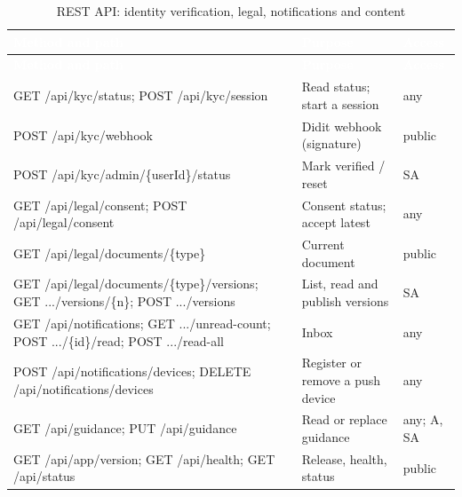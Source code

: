 {\tabfont\rowband
\begin{longtable}{@{}>{\raggedright\arraybackslash}p{}>{\raggedright\arraybackslash}p{}>{\raggedright\arraybackslash}p{}@{}}
\caption{REST API: identity verification, legal, notifications and content}\label{tab:api-2}\\
\rowcolor{najdanavy}\textcolor{white}{\sffamily\bfseries\small Method and path} & \textcolor{white}{\sffamily\bfseries\small Purpose} & \textcolor{white}{\sffamily\bfseries\small Access}\\
\endfirsthead
\rowcolor{najdanavy}\textcolor{white}{\sffamily\bfseries\small Method and path} & \textcolor{white}{\sffamily\bfseries\small Purpose} & \textcolor{white}{\sffamily\bfseries\small Access}\\
\endhead
\bottomrule\endlastfoot
GET /\allowbreak{}api/\allowbreak{}kyc/\allowbreak{}status; POST /\allowbreak{}api/\allowbreak{}kyc/\allowbreak{}session & Read status; start a session & any\\
POST /\allowbreak{}api/\allowbreak{}kyc/\allowbreak{}webhook & Didit webhook (signature) & public\\
POST /\allowbreak{}api/\allowbreak{}kyc/\allowbreak{}admin/\allowbreak{}\{userId\}/\allowbreak{}status & Mark verified /\allowbreak{} reset & SA\\
GET /\allowbreak{}api/\allowbreak{}legal/\allowbreak{}consent; POST /\allowbreak{}api/\allowbreak{}legal/\allowbreak{}consent & Consent status; accept latest & any\\
GET /\allowbreak{}api/\allowbreak{}legal/\allowbreak{}documents/\allowbreak{}\{type\} & Current document & public\\
GET /\allowbreak{}api/\allowbreak{}legal/\allowbreak{}documents/\allowbreak{}\{type\}/\allowbreak{}versions; GET .../\allowbreak{}versions/\allowbreak{}\{n\}; POST .../\allowbreak{}versions & List, read and publish versions & SA\\
GET /\allowbreak{}api/\allowbreak{}notifications; GET .../\allowbreak{}unread-count; POST .../\allowbreak{}\{id\}/\allowbreak{}read; POST .../\allowbreak{}read-all & Inbox & any\\
POST /\allowbreak{}api/\allowbreak{}notifications/\allowbreak{}devices; DELETE /\allowbreak{}api/\allowbreak{}notifications/\allowbreak{}devices & Register or remove a push device & any\\
GET /\allowbreak{}api/\allowbreak{}guidance; PUT /\allowbreak{}api/\allowbreak{}guidance & Read or replace guidance & any; A, SA\\
GET /\allowbreak{}api/\allowbreak{}app/\allowbreak{}version; GET /\allowbreak{}api/\allowbreak{}health; GET /\allowbreak{}api/\allowbreak{}status & Release, health, status & public\\
\end{longtable}}
